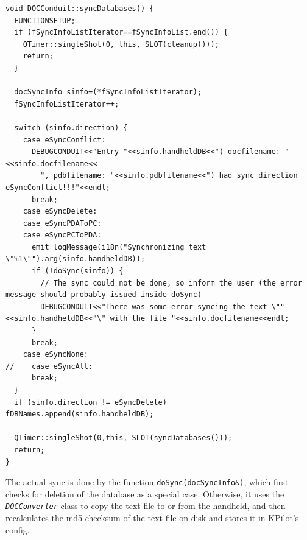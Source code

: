 \documentclass[10pt,a4paper]{article}
\newcommand{\code}[1]{{\small\texttt{#1}}}
\newcommand{\class}[1]{{\small\em\texttt{#1}}}
\begin{document}
{\footnotesize
\begin{verbatim}
void DOCConduit::syncDatabases() {
  FUNCTIONSETUP;
  if (fSyncInfoListIterator==fSyncInfoList.end()) {
    QTimer::singleShot(0, this, SLOT(cleanup()));
    return;
  }
  
  docSyncInfo sinfo=(*fSyncInfoListIterator);
  fSyncInfoListIterator++;
  
  switch (sinfo.direction) {
    case eSyncConflict:
      DEBUGCONDUIT<<"Entry "<<sinfo.handheldDB<<"( docfilename: "<<sinfo.docfilename<<
        ", pdbfilename: "<<sinfo.pdbfilename<<") had sync direction eSyncConflict!!!"<<endl;
      break;
    case eSyncDelete:
    case eSyncPDAToPC:
    case eSyncPCToPDA:
      emit logMessage(i18n("Synchronizing text \"%1\"").arg(sinfo.handheldDB));
      if (!doSync(sinfo)) {
        // The sync could not be done, so inform the user (the error message should probably issued inside doSync)
        DEBUGCONDUIT<<"There was some error syncing the text \""<<sinfo.handheldDB<<"\" with the file "<<sinfo.docfilename<<endl;
      }
      break;
    case eSyncNone:
//    case eSyncAll:
      break;
  }
  if (sinfo.direction != eSyncDelete) fDBNames.append(sinfo.handheldDB);
  
  QTimer::singleShot(0,this, SLOT(syncDatabases()));
  return;
}
\end{verbatim}
}

The actual sync is done by the function \code{doSync(docSyncInfo\&)}, which first checks for deletion of the database as a special case. Otherwise, it uses the \class{DOCConverter} class to copy the text file to or from the handheld, and then recalculates the md5 checksum of the text file on disk and stores it in KPilot's config.
\end{document}
